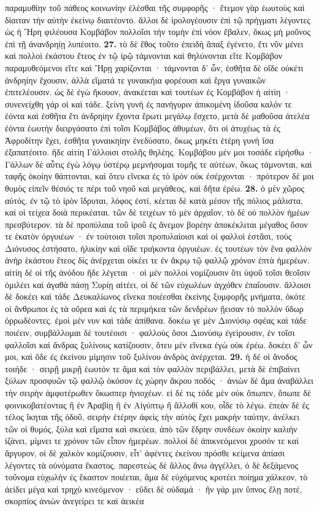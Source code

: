 \documentclass[a4paper, 11pt, oneside, polutonikogreek, german]{article}
\begin{document}
παραμυθίην τοῦ πάθεος κοινωνίην ἑλέσθαι τῆς συμφορῆς · ἔτεμον γὰρ ἑωυτοὺς καὶ δίαιταν τὴν αὐτὴν ἐκείνῳ διαιτέοντο. ἄλλοι δὲ ἱρολογέουσιν ἐπὶ τῷ πρήγματι λέγοντες ὡς ἡ Ἥρη φιλέουσα Κομβάβον πολλοῖσι τὴν τομὴν ἐπὶ νόον ἔβαλεν, ὅκως μὴ μοῦνος ἐπὶ τῇ ἀνανδρηίῃ λυπέοιτο. \textbf{27.} τὸ δὲ ἔθος τοῦτο ἐπειδὴ ἅπαξ ἐγένετο, ἔτι νῦν μένει καὶ πολλοὶ ἑκάστου ἔτεος ἐν τῷ ἱρῷ τάμνονται καὶ θηλύνονται εἴτε Κομβάβον παραμυθεόμενοι εἴτε καὶ Ἥρῃ χαρίζονται · τάμνονται δ' ὦν, ἐσθῆτα δὲ οἵδε οὐκέτι ἀνδρηίην ἔχουσιν, ἀλλὰ εἵματά τε γυναικήια φορέουσι καὶ ἔργα γυναικῶν ἐπιτελέουσιν. ὡς δὲ ἐγὼ ἤκουον, ἀνακέεται καὶ τουτέων ἐς Κομβάβον ἡ αἰτίη · συνενείχθη γάρ οἱ καὶ τάδε. ξείνη γυνὴ ἐς πανήγυριν ἀπικομένη ἰδοῦσα καλόν τε ἐόντα καὶ ἐσθῆτα ἔτι ἀνδρηίην ἔχοντα ἔρωτι μεγάλῳ ἔσχετο, μετὰ δὲ μαθοῦσα ἀτελέα ἐόντα ἑωυτὴν διειργάσατο ἐπὶ τοῖσι Κομβάβος ἀθυμέων, ὅτι οἱ ἀτυχέως τὰ ἐς Ἀφροδίτην ἔχει, ἐσθῆτα γυναικηίην ἐνεδύσατο, ὅκως μηκέτι ἑτέρη γυνὴ ἴσα ἐξαπατέοιτο. ἥδε αἰτίη Γάλλοισι στολῆς θηλέης. Κομβάβου μέν μοι τοσάδε εἰρήσθω · Γάλλων δὲ αὖτις ἐγὼ λόγῳ ὑστέρῳ μεμνήσομαι τομῆς τε αὐτέων, ὅκως τάμνονται, καὶ ταφῆς ὁκοίην θάπτονται, καὶ ὅτευ εἵνεκα ἐς τὸ ἱρὸν οὐκ ἐσέρχονται · πρότερον δέ μοι θυμὸς εἰπεῖν θέσιός τε πέρι τοῦ νηοῦ καὶ μεγάθεος, καὶ δῆτα ἐρέω. \textbf{28.} ὁ μὲν χῶρος αὐτός, ἐν τῷ τὸ ἱρὸν ἵδρυται, λόφος ἐστί, κέεται δὲ κατὰ μέσον τῆς πόλιος μάλιστα, καί οἱ τείχεα δοιὰ περικέαται. τῶν δὲ τειχέων τὸ μὲν ἀρχαῖον, τὸ δὲ οὐ πολλὸν ἡμέων πρεσβύτερον. τὰ δὲ προπύλαια τοῦ ἱροῦ ἐς ἄνεμον βορέην ἀποκέκλιται μέγαθος ὅσον τε ἑκατὸν ὀργυιέων · ἐν τούτοισι τοῖσι προπυλαίοισι καὶ οἱ φαλλοὶ ἑστᾶσι, τοὺς Διόνυσος ἐστήσατο, ἡλικίην καὶ οἵδε τριήκοντα ὀργυιέων. ἐς τουτέων τὸν ἕνα φαλλὸν ἀνὴρ ἑκάστου ἔτεος δὶς ἀνέρχεται οἰκέει τε ἐν ἄκρῳ τῷ φαλλῷ χρόνον ἑπτὰ ἡμερέων. αἰτίη δέ οἱ τῆς ἀνόδου ἥδε λέγεται · οἱ μὲν πολλοὶ νομίζουσιν ὅτι ὑψοῦ τοῖσι θεοῖσιν ὁμιλέει καὶ ἀγαθὰ πάσῃ Συρίῃ αἰτέει, οἱ δὲ τῶν εὐχωλέων ἀγχόθεν ἐπαΐουσιν. ἄλλοισι δὲ δοκέει καὶ τάδε Δευκαλίωνος εἵνεκα ποιέεσθαι ἐκείνης ξυμφορῆς μνήματα, ὁκότε οἱ ἄνθρωποι ἐς τὰ οὔρεα καὶ ἐς τὰ περιμήκεα τῶν δενδρέων ᾔεισαν τὸ πολλὸν ὕδωρ ὀρρωδέοντες. ἐμοὶ μέν νυν καὶ τάδε ἀπίθανα. δοκέω γε μὲν Διονύσῳ σφέας καὶ τάδε ποιέειν, συμβάλλομαι δὲ τουτέοισι · φαλλοὺς ὅσοι Διονύσῳ ἐγείρουσιν, ἐν τοῖσι φαλλοῖσι καὶ ἄνδρας ξυλίνους κατίζουσιν, ὅτευ μὲν εἵνεκα ἐγὼ οὐκ ἐρέω. δοκέει δ' ὦν μοι, καὶ ὅδε ἐς ἐκείνου μίμησιν τοῦ ξυλίνου ἀνδρὸς ἀνέρχεται. \textbf{29.} ἡ δέ οἱ ἄνοδος τοιήδε · σειρῇ μικρῇ ἑωυτόν τε ἅμα καὶ τὸν φαλλὸν περιβάλλει, μετὰ δὲ ἐπιβαίνει ξύλων προσφυῶν τῷ φαλλῷ ὁκόσον ἐς χώρην ἄκρου ποδός · ἀνιὼν δὲ ἅμα ἀναβάλλει τὴν σειρὴν ἀμφοτέρωθεν ὅκωσπερ ἡνιοχέων. εἰ δέ τις τόδε μὲν οὐκ ὄπωπεν, ὄπωπε δὲ φοινικοβατέοντας ἢ ἐν Ἀραβίῃ ἢ ἐν Αἰγύπτῳ ἢ ἄλλοθί κου, οἶδε τὸ λέγω. ἐπεὰν δὲ ἐς τέλος ἵκηται τῆς ὁδοῦ, σειρὴν ἑτέρην ἀφεὶς τὴν αὐτὸς ἔχει μακρὴν ταύτην, ἀνέλκει τῶν οἱ θυμός, ξύλα καὶ εἵματα καὶ σκεύεα, ἀπὸ τῶν ἕδρην συνδέων ὁκοίην καλιὴν ἱζάνει, μίμνει τε χρόνον τῶν εἶπον ἡμερέων. πολλοὶ δὲ ἀπικνεόμενοι χρυσόν τε καὶ ἄργυρον, οἱ δὲ χαλκὸν κομίζουσιν, εἶτ' ἀφέντες ἐκείνου πρόσθε κείμενα ἀπίασι λέγοντες τὰ οὐνόματα ἕκαστος. παρεστεὼς δὲ ἄλλος ἄνω ἀγγέλλει, ὁ δὲ δεξάμενος τοὔνομα εὐχωλὴν ἐς ἕκαστον ποιέεται, ἅμα δὲ εὐχόμενος κροτέει ποίημα χάλκεον, τὸ ἀείδει μέγα καὶ τρηχὺ κινεόμενον · εὕδει δὲ οὐδαμά · ἢν γάρ μιν ὕπνος ἕλῃ ποτέ, σκορπίος ἀνιὼν ἀνεγείρει τε καὶ ἀεικέα 
\end{document}
